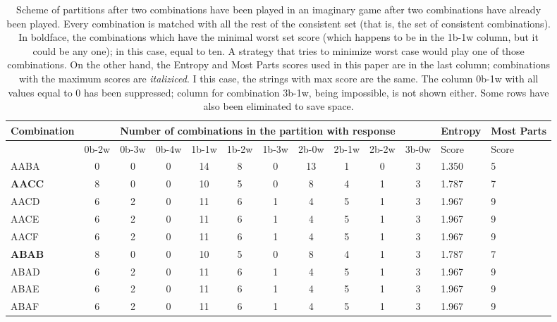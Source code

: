 \documentclass[conference]{IEEEtran}
\begin{document}
\begin{table}[bht]
\caption{Scheme of partitions after two combinations have been played
  in an imaginary game  after two combinations have already been
  played.  Every combination is matched with all
  the rest of the consistent set (that is, the set of consistent combinations).
In boldface, the combinations which have the minimal worst set score (which 
happens to be in the 1b-1w column, 
but it could be any one); in this case, equal to ten. A strategy that
tries to minimize worst case would play one of those combinations. On
the other hand, the Entropy and Most Parts scores used in this paper are in the last
column; combinations with the maximum scores are {\em
  italiziced}. I this case, the strings with max score are the same.
The column 0b-1w with all values equal to 0 has been suppressed;
column for combination 3b-1w, being impossible, is not shown
either. Some rows have also been eliminated to save space.  \label{tab:partitions}}
\small
\centering
\begin{tabular}{|l|c|c|c|c|c|c|c|c|c|c|l|l|}
\hline
Combination & \multicolumn{10}{|c|}{Number of combinations in the
  partition with response} & Entropy & Most Parts \\
\hline
 &0b-2w& 0b-3w& 0b-4w& 1b-1w& 1b-2w& 1b-3w& 2b-0w& 2b-1w& 2b-2w& 3b-0w
 & Score & Score \\
AABA &0 &0 &0 &14 &8 &0 &13 &1 &0 &3  & 1.350 & 5 \\
{\bf AACC} &8 &0 &0 &10 &5 &0 &8 &4 &1 &3  & 1.787 & 7 \\
AACD &6 &2 &0 &11 &6 &1 &4 &5 &1 &3  & 1.967 & 9 \\
AACE &6 &2 &0 &11 &6 &1 &4 &5 &1 &3  & 1.967 & 9 \\
AACF &6 &2 &0 &11 &6 &1 &4 &5 &1 &3  & 1.967 & 9 \\
{\bf ABAB} &8 &0 &0 &10 &5 &0 &8 &4 &1 &3  & 1.787 & 7 \\
ABAD &6 &2 &0 &11 &6 &1 &4 &5 &1 &3  & 1.967 & 9 \\
ABAE &6 &2 &0 &11 &6 &1 &4 &5 &1 &3  & 1.967 & 9 \\
ABAF &6 &2 &0 &11 &6 &1 &4 &5 &1 &3  & 1.967 & 9 \\

\end{tabular}
\end{table}
\end{document}
